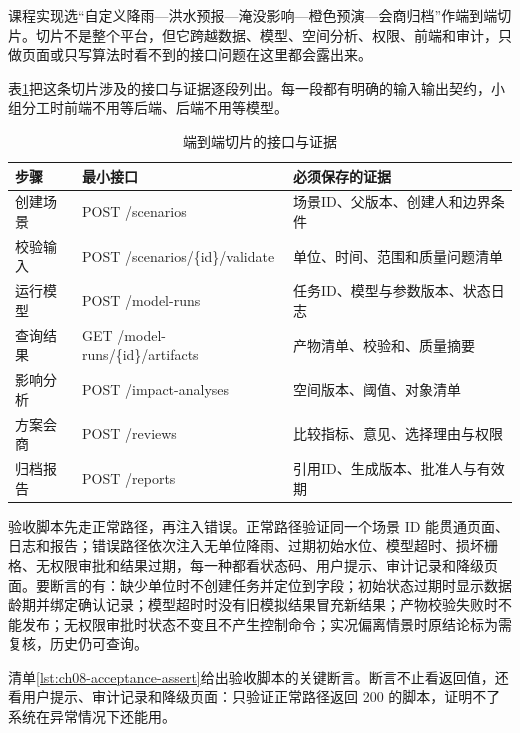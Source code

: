 课程实现选“自定义降雨—洪水预报—淹没影响—橙色预演—会商归档”作端到端切片。切片不是整个平台，但它跨越数据、模型、空间分析、权限、前端和审计，只做页面或只写算法时看不到的接口问题在这里都会露出来。

表\ref{tab:end-to-end-slice}把这条切片涉及的接口与证据逐段列出。每一段都有明确的输入输出契约，小组分工时前端不用等后端、后端不用等模型。

\begin{table}[htbp]
\centering
\caption{端到端切片的接口与证据}
\label{tab:end-to-end-slice}
\begin{tabular}{p{2.2cm}p{4.7cm}p{5.6cm}}
\toprule
步骤 & 最小接口 & 必须保存的证据 \\
\midrule
创建场景 & POST /scenarios & 场景ID、父版本、创建人和边界条件 \\
校验输入 & POST /scenarios/\{id\}/validate & 单位、时间、范围和质量问题清单 \\
运行模型 & POST /model-runs & 任务ID、模型与参数版本、状态日志 \\
查询结果 & GET /model-runs/\{id\}/artifacts & 产物清单、校验和、质量摘要 \\
影响分析 & POST /impact-analyses & 空间版本、阈值、对象清单 \\
方案会商 & POST /reviews & 比较指标、意见、选择理由与权限 \\
归档报告 & POST /reports & 引用ID、生成版本、批准人与有效期 \\
\bottomrule
\end{tabular}
\end{table}

验收脚本先走正常路径，再注入错误。正常路径验证同一个场景 ID 能贯通页面、日志和报告；错误路径依次注入无单位降雨、过期初始水位、模型超时、损坏栅格、无权限审批和结果过期，每一种都看状态码、用户提示、审计记录和降级页面。要断言的有：缺少单位时不创建任务并定位到字段；初始状态过期时显示数据龄期并绑定确认记录；模型超时时没有旧模拟结果冒充新结果；产物校验失败时不能发布；无权限审批时状态不变且不产生控制命令；实况偏离情景时原结论标为需复核，历史仍可查询。

清单\ref{lst:ch08-acceptance-assert}给出验收脚本的关键断言。断言不止看返回值，还看用户提示、审计记录和降级页面：只验证正常路径返回 200 的脚本，证明不了系统在异常情况下还能用。

